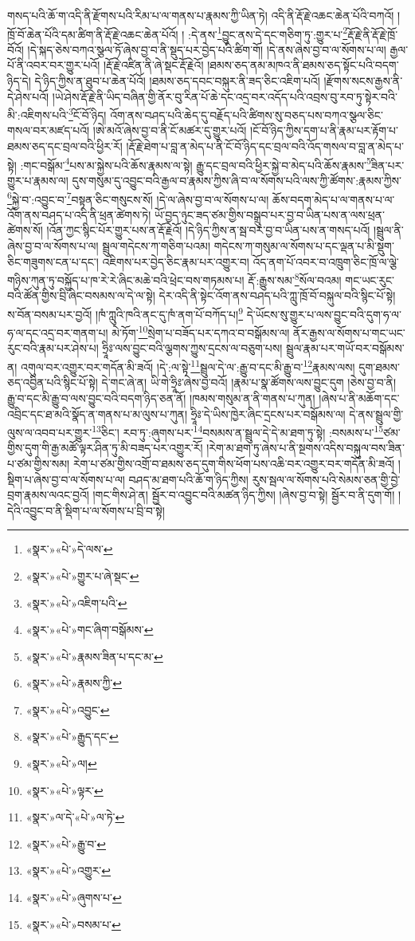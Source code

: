 གསད་པའི་ཆོ་ག་འདི་ནི་རྫོགས་པའི་རིམ་པ་ལ་གནས་པ་རྣམས་ཀྱི་ཡིན་ཏེ། འདི་ནི་རྡོ་རྗེ་འཆང་ཆེན་པོའི་བཀའོ། །ཁྲོ་བོ་ཆེན་པོའི་དམ་ཚིག་ནི་རྡོ་རྗེ་འཆང་ཆེན་པོའོ། །
:དེ་ནས་\footnote{«སྣར་»«པེ་»དེ་ལས་}བྱུང་ནས་དེ་དང་གཅིག་ཏུ་:གྱུར་པ་\footnote{«སྣར་»«པེ་»གྱུར་པ་ཞེ་སྡང་}རྡོ་རྗེ་ནི་རྡོ་རྗེ་ཁྲོ་བོའོ། །དེ་སྐད་ཅེས་བཀའ་སྩལ་ཏོ་ཞེས་བྱ་བ་ནི་སྡུད་པར་བྱེད་པའི་ཚིག་གོ། །དེ་ནས་ཞེས་བྱ་བ་ལ་སོགས་པ་ལ། རྒྱལ་པོ་ནི་འབར་བར་གྱུར་པའོ། །རྡོ་རྗེ་འཛིན་ནི་ཞེ་སྡང་རྡོ་རྗེའོ། །ཐམས་ཅད་ནམ་མཁའ་ནི་ཐམས་ཅད་སྟོང་པའི་བདག་ཉིད་དེ། དེ་ཉིད་ཀྱིས་ན་ཐུབ་པ་ཆེན་པོའོ། །ཐམས་ཅད་དབང་བསྐུར་ནི་ཟད་ཅིང་འཇིག་པའོ། །རྫོགས་སངས་རྒྱས་ནི་དེ་ཤེས་པའོ། །ཡེ་ཤེས་རྡོ་རྗེ་ནི་ཡིད་བཞིན་གྱི་ནོར་བུ་རིན་པོ་ཆེ་དང་འདྲ་བར་འདོད་པའི་འབྲས་བུ་རབ་ཏུ་སྟེར་བའི་མི་:འཇིགས་པའི་\footnote{«སྣར་»«པེ་»འཇིག་པའི་}ངོ་བོ་ཉིད། འོག་ནས་བཤད་པའི་ཆེད་དུ་བརྗོད་པའི་ཚིགས་སུ་བཅད་པས་བཀའ་སྩལ་ཅིང་གསལ་བར་མཛད་པའོ། །ཨེ་མའོ་ཞེས་བྱ་བ་ནི་ངོ་མཚར་དུ་གྱུར་པའོ། །ངོ་བོ་ཉིད་ཀྱིས་དག་པ་ནི་རྣམ་པར་རྟོག་པ་ཐམས་ཅད་དང་བྲལ་བའི་ཕྱིར་རོ། །རྡོ་རྗེ་ཐེག་པ་བླ་ན་མེད་པ་ནི་ངོ་བོ་ཉིད་དང་བྲལ་བའི་འོད་གསལ་བ་བླ་ན་མེད་པ་སྟེ། :གང་བསྒོམ་\footnote{«སྣར་»«པེ་»གང་ཞིག་བསྒོམས་}པས་མ་སྐྱེས་པའི་ཆོས་རྣམས་ལ་སྟེ། རྒྱུ་དང་བྲལ་བའི་ཕྱིར་སྐྱེ་བ་མེད་པའི་ཆོས་རྣམས་\footnote{«སྣར་»«པེ་»རྣམས་ཟིན་པ་དང་མ་}ཟིན་པར་གྱུར་པ་རྣམས་ལ། དུས་གསུམ་དུ་འབྱུང་བའི་རྒྱལ་བ་རྣམས་ཀྱིས་ཞི་བ་ལ་སོགས་པའི་ལས་ཀྱི་ཚོགས་:རྣམས་ཀྱིས་\footnote{«སྣར་»«པེ་»རྣམས་ཀྱི་}སྐྱེ་བ་:འབྱུང་བ་\footnote{«སྣར་»«པེ་»འབྱུང་}བསྟན་ཅིང་གསུངས་སོ། །དེ་ལ་ཞེས་བྱ་བ་ལ་སོགས་པ་ལ། ཆོས་བདག་མེད་པ་ལ་གནས་པ་ལ་འོག་ནས་བཤད་པ་འདི་ནི་ཕྲན་ཚེགས་ཏེ། ཡོ་བྱད་ཉུང་ཟད་ཙམ་གྱིས་བསྒྲུབ་པར་བྱ་བ་ཡིན་པས་ན་ལས་ཕྲན་ཚེགས་སོ། །འོན་ཀྱང་སྙིང་པོར་གྱུར་པས་ན་རྡོ་རྗེའོ། །དེ་ཉིད་ཀྱིས་ན་སྦ་བར་བྱ་བ་ཡིན་པས་ན་གསད་པའོ། །སྦྲུལ་ནི་ཞེས་བྱ་བ་ལ་སོགས་པ་ལ། སྦྲུལ་གདེངས་ཀ་གཅིག་པའམ། གདེངས་ཀ་གསུམ་ལ་སོགས་པ་དང་ལྡན་པ་མི་སྡུག་ཅིང་གཟུགས་ངན་པ་དང་། འཇིགས་པར་བྱེད་ཅིང་རྣམ་པར་འགྱུར་བ། འོད་ནག་པོ་འབར་བ་འཁྲུག་ཅིང་ཁྲོ་ལ་ལྕེ་གཉིས་ཀུན་ཏུ་བསྐྱོད་པ་ཁ་རེ་རེ་ཞིང་མཆེ་བའི་ཕྲེང་བས་གཏམས་པ། རྡོ་:རྒྱུས་སམ་\footnote{«སྣར་»«པེ་»རྒྱུད་དང་}སོལ་བའམ། གང་ཡང་རུང་བའི་ཚོན་གྱིས་བྲི་ཞིང་བསམས་ལ་དེ་ལ་སྟེ། དེར་འདི་ནི་སྟེང་འོག་ནས་བཤད་པའི་ཀླུ་ཁྲོ་བོ་བསྐུལ་བའི་སྙིང་པོ་སྟེ། ས་བོན་བསམ་པར་བྱའོ། །ཁཾ་ཀླུའི་ཁའི་ནང་དུ་ཁཾ་ནག་པོ་བཀོད་པ།\footnote{«སྣར་»«པེ་»ལ།} དེ་ཡོངས་སུ་གྱུར་པ་ལས་བྱུང་བའི་དུག་ཧ་ལ་ཧ་ལ་དང་འདྲ་བར་གནག་པ། མེ་ཏོག་\footnote{«སྣར་»«པེ་»ལྟར་}སྲེག་པ་བཟོད་པར་དཀའ་བ་བསྒོམས་ལ། ནོར་རྒྱས་ལ་སོགས་པ་གང་ཡང་རུང་བའི་རྣམ་པར་ཤེས་པ། ཧྲཱིཿ་ལས་བྱུང་བའི་ལྕགས་ཀྱུས་དྲངས་ལ་བཅུག་པས། སྦྲུལ་རྣམ་པར་གཡོ་བར་བསྒོམས་ན། འགུལ་བར་འགྱུར་བར་གདོན་མི་ཟའོ། །དེ་:ལ་སྟེ་\footnote{«སྣར་»ལ་དེ་«པེ་»ལ་ཏེ་}སྦྲུལ་དེ་ལ་:རྒྱུ་བ་དང་མི་རྒྱུ་བ་\footnote{«སྣར་»«པེ་»རྒྱུ་བ་}རྣམས་ལས། དུག་ཐམས་ཅད་འབྱིན་པའི་སྙིང་པོ་སྟེ། དེ་གང་ཞེ་ན། ཡི་གེ་ཧྲཱིཿ་ཞེས་བྱ་བའོ། །རྣམ་པ་སྣ་ཚོགས་ལས་བྱུང་དུག །ཅེས་བྱ་བ་ནི། རྒྱུ་བ་དང་མི་རྒྱུ་བ་ལས་བྱུང་བའི་བདག་ཉིད་ཅན་ནོ། །ཁམས་གསུམ་ན་ནི་གནས་པ་ཀུན། །ཞེས་པ་ནི་མཆོག་དང་འབྲིང་དང་ཐ་མའི་སྣོད་ན་གནས་པ་མ་ལུས་པ་ཀུན། ཧྲཱིཿ་དེ་ཡིས་ཁྱེར་ཞིང་དྲངས་པར་བསྒོམས་ལ། དེ་ནས་སྦྲུལ་གྱི་ལུས་ལ་འབབ་པར་གྱུར་\footnote{«སྣར་»«པེ་»འགྱུར་}ཅིང་། རབ་ཏུ་:ཞུགས་པར་\footnote{«སྣར་»«པེ་»ཞུགས་པ་}བསམས་ན་སྦྲུལ་དེ་དེ་མ་ཐག་ཏུ་སྟེ། :བསམས་པ་\footnote{«སྣར་»«པེ་»བསམ་པ་}ཙམ་གྱིས་དུག་གི་རྒྱ་མཚོ་ལྟར་ཤིན་ཏུ་མི་བཟད་པར་འགྱུར་རོ། །རེག་མ་ཐག་ཏུ་ཞེས་པ་ནི་སྔགས་འདིས་བསྐུལ་བས་ཟིན་པ་ཙམ་གྱིས་སམ། རེག་པ་ཙམ་གྱིས་འགྲོ་བ་ཐམས་ཅད་དུག་གིས་ཕོག་པས་འཆི་བར་འགྱུར་བར་གདོན་མི་ཟའོ། །སྡིག་པ་ཞེས་བྱ་བ་ལ་སོགས་པ་ལ། བཤད་མ་ཐག་པའི་ཆོ་ག་ཉིད་ཀྱིས། རུས་སྦལ་ལ་སོགས་པའི་སེམས་ཅན་གྱི་བྱེ་བྲག་རྣམས་ལའང་བྱའོ། །གང་གིས་ཤེ་ན། སྦྱོར་བ་འབྱུང་བའི་མཚན་ཉིད་ཀྱིས། །ཞེས་བྱ་བ་སྟེ། སྦྱོར་བ་ནི་དུག་གོ། །དེའི་འབྱུང་བ་ནི་སྡིག་པ་ལ་སོགས་པ་བྲི་བ་སྟེ། 